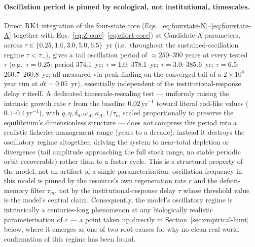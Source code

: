 \documentclass[twocolumn,10pt]{article}
\begin{document}
\paragraph{Oscillation period is pinned by ecological, not institutional, timescales.} Direct RK4 integration of the four-state core (Eqs.~\eqref{eq:fourstate-N}--\eqref{eq:fourstate-A} together with Eqs.~\eqref{eq:Z-core}--\eqref{eq:effort-core}) at Candidate A parameters, across $\tau\in\{0.25,1.0,3.0,5.0,6.5\}$~yr (i.e.\ throughout the sustained-oscillation regime $\tau<\tau_-$), gives a tail oscillation period of $\approx 250$--$390$ years at every tested $\tau$ (e.g.\ $\tau=0.25$: period $374.1$~yr; $\tau=1.0$: $378.1$~yr; $\tau=3.0$: $385.6$~yr; $\tau=6.5$: $260.7$--$260.8$~yr; all measured via peak-finding on the converged tail of a $2\times10^4$-year run at $dt=0.05$~yr), essentially independent of the institutional-response delay $\tau$ itself. A dedicated timescale-rescaling test --- uniformly raising the intrinsic growth rate $r$ from the baseline $0.02\,\text{yr}^{-1}$ toward literal cod-like values ($0.1$--$0.4\,\text{yr}^{-1}$), with $q,\eta,\delta_0,\omega_A,\kappa_A,1/\tau_m$ scaled proportionally to preserve the equilibrium's dimensionless structure --- does \emph{not} compress this period into a realistic fisheries-management range (years to a decade); instead it destroys the oscillatory regime altogether, driving the system to near-total depletion or divergence (tail amplitude approaching the full stock range, no stable periodic orbit recoverable) rather than to a faster cycle. This is a structural property of the model, not an artifact of a single parameterisation: oscillation frequency in this model is pinned by the resource's own regeneration rate $r$ and the deficit-memory filter $\tau_m$, not by the institutional-response delay $\tau$ whose threshold value is the model's central claim. Consequently, the model's oscillatory regime is intrinsically a centuries-long phenomenon at any biologically realistic parameterisation of $r$ --- a point taken up directly in Section~\ref{sec:empirical-hunt} below, where it emerges as one of two root causes for why no clean real-world confirmation of this regime has been found.
\end{document}
